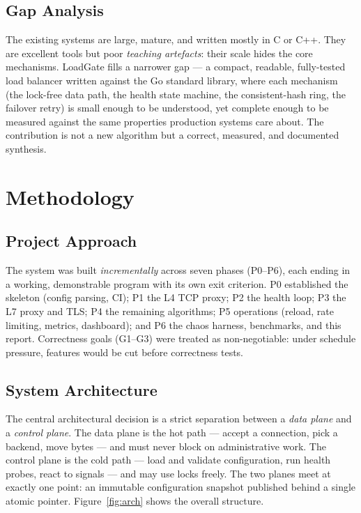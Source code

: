 \documentclass[11pt,a4paper]{report}
\begin{document}
\section{Gap Analysis}
The existing systems are large, mature, and written mostly in C or C++. They are excellent
tools but poor \emph{teaching artefacts}: their scale hides the core mechanisms. LoadGate
fills a narrower gap --- a compact, readable, fully-tested load balancer written against the
Go standard library, where each mechanism (the lock-free data path, the health state machine,
the consistent-hash ring, the failover retry) is small enough to be understood, yet complete
enough to be measured against the same properties production systems care about. The
contribution is not a new algorithm but a correct, measured, and documented synthesis.

\chapter{Methodology}

\section{Project Approach}
The system was built \emph{incrementally} across seven phases (P0--P6), each ending in a
working, demonstrable program with its own exit criterion. P0 established the skeleton (config
parsing, CI); P1 the L4 TCP proxy; P2 the health loop; P3 the L7 proxy and TLS; P4 the
remaining algorithms; P5 operations (reload, rate limiting, metrics, dashboard); and P6 the
chaos harness, benchmarks, and this report. Correctness goals (G1--G3) were treated as
non-negotiable: under schedule pressure, features would be cut before correctness tests.

\section{System Architecture}
The central architectural decision is a strict separation between a \emph{data plane} and a
\emph{control plane}. The data plane is the hot path --- accept a connection, pick a backend,
move bytes --- and must never block on administrative work. The control plane is the cold path
--- load and validate configuration, run health probes, react to signals --- and may use locks
freely. The two planes meet at exactly one point: an immutable configuration snapshot published
behind a single atomic pointer. Figure~\ref{fig:arch} shows the overall structure.
\end{document}
